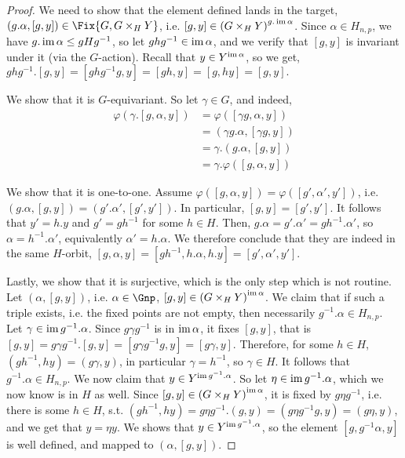 \begin{proof}
	We need to show that the element defined lands in the target, $\left(g. \alpha, \left[g, y\right]\right) \in \Fix{G, G \times_H Y}$, i.e. $\left[g, y\right] \in \left(G \times_H Y\right)^{g. \operatorname{im} \alpha}$.
	Since $\alpha \in H_{n,p}$, we have $g. \operatorname{im} \alpha \leq gHg^{-1}$, so let $ghg^{-1} \in \operatorname{im} \alpha$, and we verify that $\left[g, y\right]$ is invariant under it (via the $G$-action).
	Recall that $y \in Y^{\operatorname{im} \alpha}$, so we get,
	$
	ghg^{-1}.\left[g, y\right]
	= \left[ghg^{-1} g, y\right]
	= \left[gh, y\right]
	= \left[g, hy\right]
	= \left[g, y\right].
	$
	
	We show that it is $G$-equivariant.
	So let $\gamma \in G$, and indeed,
	\begin{align*}
		\varphi\left(\gamma. \left[g, \alpha, y\right]\right)
		&= \varphi\left(\left[\gamma g, \alpha, y\right]\right)\\
		&= \left(\gamma g. \alpha, \left[\gamma g, y\right]\right)\\
		&= \gamma. \left(g. \alpha, \left[g, y\right]\right)\\
		&= \gamma. \varphi\left(\left[g, \alpha, y\right]\right)
	\end{align*}
	
	We show that it is one-to-one.
	Assume $\varphi\left(\left[g, \alpha, y\right]\right) = \varphi\left(\left[g', \alpha', y'\right]\right)$,
	i.e. $\left(g. \alpha, \left[g, y\right]\right) = \left(g'. \alpha', \left[g', y'\right]\right)$.
	In particular, $\left[g, y\right] = \left[g', y'\right]$.
	It follows that $y' = h.y$ and $g' = gh^{-1}$ for some $h \in H$.
	Then, $g. \alpha = g'. \alpha' = gh^{-1}. \alpha'$, so $\alpha = h^{-1}. \alpha'$, equivalently $\alpha' = h. \alpha$.
	We therefore conclude that they are indeed in the same $H$-orbit,
	$
	\left[g, \alpha, y\right]
	= \left[gh^{-1}, h.\alpha, h.y\right]
	= \left[g', \alpha', y'\right]
	$.
	
	Lastly, we show that it is surjective, which is the only step which is not routine.
	Let $\left(\alpha, \left[g, y\right]\right)$, i.e. $\alpha \in \Gnp$, $\left[g, y\right] \in \left(G \times_H Y\right)^{\operatorname{im} \alpha}$.
	We claim that if such a triple exists, i.e. the fixed points are not empty, then necessarily $g^{-1}. \alpha \in H_{n,p}$.
	Let $\gamma \in \operatorname{im} g^{-1}. \alpha$.
	Since $g \gamma g^{-1}$ is in $\operatorname{im} \alpha$, it fixes $\left[g, y\right]$, that is
	$
	\left[g, y\right]
	= g \gamma g^{-1}. \left[g, y\right]
	= \left[g \gamma g^{-1} g, y\right]
	= \left[g \gamma, y\right]
	$.
	Therefore, for some $h \in H$,
	$\left(gh^{-1}, hy\right)= \left(g \gamma, y\right)$,
	in particular $\gamma = h^{-1}$, so $\gamma \in H$.
	It follows that $g^{-1}. \alpha \in H_{n,p}$.
	We now claim that $y \in Y^{\operatorname{im} g^{-1}. \alpha}$.
	So let $\eta \in \operatorname{im} g^{-1}. \alpha$, which we now know is in $H$ as well.
	Since $\left[g, y\right] \in \left(G \times_H Y\right)^{\operatorname{im} \alpha}$, it is fixed by $g \eta g^{-1}$, i.e. there is some $h \in H$, s.t.
	$
	\left(gh^{-1}, hy\right)
	= g \eta g^{-1}. \left(g, y\right)
	= \left(g \eta g^{-1} g, y\right)
	= \left(g \eta, y\right)
	$,
	and we get that $y = \eta y$.
	We shows that $y \in Y^{\operatorname{im} g^{-1}. \alpha}$, so the element $\left[g, g^{-1} \alpha, y\right]$ is well defined, and mapped to $\left(\alpha, \left[g, y\right]\right)$.
	

\end{proof}
